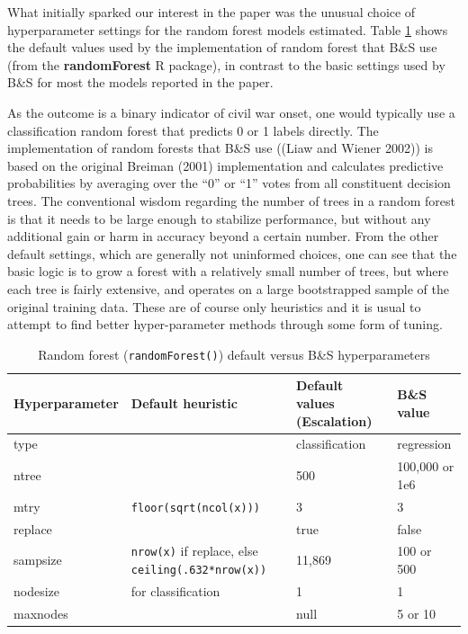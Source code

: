 \documentclass[
]{article}
\begin{document}
What initially sparked our interest in the paper was the unusual choice of hyperparameter settings for the random forest models estimated. Table \ref{tab:hp} shows the default values used by the implementation of random forest that B\&S use (from the \textbf{randomForest} R package), in contrast to the basic settings used by B\&S for most the models reported in the paper.

As the outcome is a binary indicator of civil war onset, one would typically use a classification random forest that predicts 0 or 1 labels directly. The implementation of random forests that B\&S use ((Liaw and Wiener 2002)) is based on the original Breiman (2001) implementation and calculates predictive probabilities by averaging over the ``0'' or ``1'' votes from all constituent decision trees. The conventional wisdom regarding the number of trees in a random forest is that it needs to be large enough to stabilize performance, but without any additional gain or harm in accuracy beyond a certain number. From the other default settings, which are generally not uninformed choices, one can see that the basic logic is to grow a forest with a relatively small number of trees, but where each tree is fairly extensive, and operates on a large bootstrapped sample of the original training data. These are of course only heuristics and it is usual to attempt to find better hyper-parameter methods through some form of tuning.

\begin{table}
\caption{\label{tab:hp} Random forest (\texttt{randomForest()}) default versus B\&S hyperparameters}
\begin{tabular}{l>{\raggedright\arraybackslash}p{2in}ll}
\toprule
Hyperparameter & Default heuristic & Default values (Escalation) & B\&S value \\
\midrule
type & & classification & regression \\
ntree & & 500 & 100,000 or 1e6 \\
mtry & \texttt{floor(sqrt(ncol(x)))} & 3 & 3 \\
replace & & true & false \\
sampsize & \texttt{nrow(x)} if replace, else \texttt{ceiling(.632*nrow(x))} & 11,869 & 100 or
500 \\
nodesize & 1 for classification & 1 & 1 \\
maxnodes & & null & 5 or 10 \\
\bottomrule
\end{tabular}
\end{table}
\end{document}

